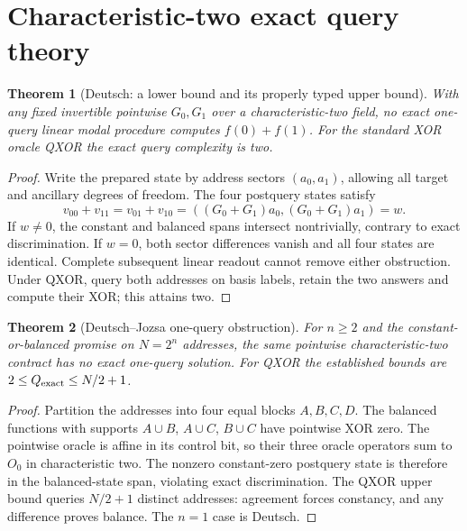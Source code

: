 \documentclass[11pt]{article}
\newtheorem{theorem}{Theorem}[section]
\theoremstyle{remark}
\begin{document}
\section{Characteristic-two exact query theory}
\label{sec:query}
\begin{theorem}[Deutsch: a lower bound and its properly typed upper bound]
With any fixed invertible pointwise $G_0,G_1$ over a characteristic-two field,
no exact one-query linear modal procedure computes $f(0)+f(1)$. For the standard
XOR oracle QXOR the exact query complexity is two.
\end{theorem}
\begin{proof}
Write the prepared state by address sectors $(a_0,a_1)$, allowing all target and
ancillary degrees of freedom. The four postquery states satisfy
\[
 v_{00}+v_{11}=v_{01}+v_{10}
 =((G_0+G_1)a_0,(G_0+G_1)a_1)=w.
\]
If $w\ne0$, the constant and balanced spans intersect nontrivially, contrary
to exact discrimination. If $w=0$, both sector differences vanish and all four
states are identical. Complete subsequent linear readout cannot remove either
obstruction. Under QXOR, query both addresses on basis labels, retain the two
answers and compute their XOR; this attains two.
\end{proof}

\begin{theorem}[Deutsch--Jozsa one-query obstruction]
For $n\geq2$ and the constant-or-balanced promise on $N=2^n$ addresses, the
same pointwise characteristic-two contract has no exact one-query solution.
For QXOR the established bounds are $2\leq Q_{\rm exact}\leq N/2+1$.
\end{theorem}
\begin{proof}
Partition the addresses into four equal blocks $A,B,C,D$. The balanced
functions with supports $A\cup B$, $A\cup C$, $B\cup C$ have pointwise XOR
zero. The pointwise oracle is affine in its control bit, so their three oracle
operators sum to $O_0$ in characteristic two. The nonzero constant-zero
postquery state is therefore in the balanced-state span, violating exact
discrimination. The QXOR upper bound queries $N/2+1$ distinct addresses: agreement
forces constancy, and any difference proves balance. The $n=1$ case is Deutsch.
\end{proof}
\end{document}
